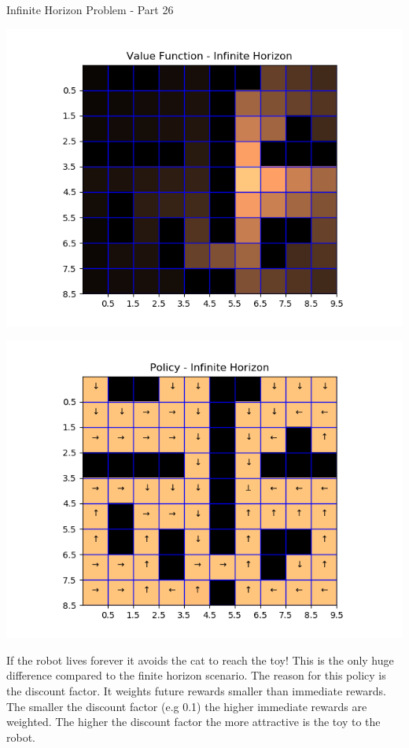 \begin{questions}
\begin{question}{Infinite Horizon Problem - Part 2}{6}
\begin{answer}
\noindent\begin{minipage}{.5\textwidth}
	\centering
	\includegraphics[width=1\textwidth]{img/infinitehorizon_2c.png} 
	\label{fig:2c1}            
\end{minipage}%
\begin{minipage}{.5\textwidth}
	\centering
	\includegraphics[width=1\textwidth]{img/policy_2c.png} 
	\label{fig:2c2}               
\end{minipage}


If the robot lives forever it avoids the cat to reach the toy! This is the only huge difference compared to the finite horizon scenario. The reason for this policy is the discount factor. It weights future rewards smaller than immediate rewards. The smaller the discount factor (e.g 0.1) the higher immediate rewards are weighted. The higher the discount factor the more attractive is the toy to the robot.


\end{answer}
\end{question}
\end{questions}
